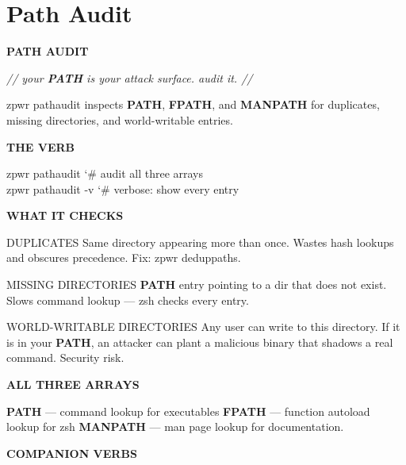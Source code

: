 \documentclass[11pt,a4paper,twoside]{book}
\begin{document}
\vspace{16pt}

\section{Path Audit}


\vspace{10pt}
{\large\bfseries\color{neoncyan} PATH AUDIT}\vspace{6pt}

{\small\itshape\color{dimtext} // your \textbf{PATH} is your attack surface. audit it. //}

zpwr pathaudit inspects \textbf{PATH}, \textbf{FPATH}, and \textbf{MANPATH} for duplicates, missing directories, and world-writable entries.


\vspace{12pt}
{\bfseries\color{neonyellow} THE VERB}\vspace{4pt}

\begin{codebox}
\color{neongreen}zpwr pathaudit             {\char`\#} audit all three arrays\\
\color{neongreen}zpwr pathaudit -v          {\char`\#} verbose: show every entry\\
\end{codebox}


\vspace{12pt}
{\bfseries\color{neonyellow} WHAT IT CHECKS}\vspace{4pt}

DUPLICATES Same directory appearing more than once. Wastes hash lookups and obscures precedence. Fix: zpwr deduppaths.

MISSING DIRECTORIES \textbf{PATH} entry pointing to a dir that does not exist. Slows command lookup — zsh checks every entry.

WORLD-WRITABLE DIRECTORIES Any user can write to this directory. If it is in your \textbf{PATH}, an attacker can plant a malicious binary that shadows a real command. Security risk.


\vspace{12pt}
{\bfseries\color{neonyellow} ALL THREE ARRAYS}\vspace{4pt}

\textbf{PATH}     — command lookup for executables \textbf{FPATH}    — function autoload lookup for zsh \textbf{MANPATH}  — man page lookup for documentation.


\vspace{12pt}
{\bfseries\color{neonyellow} COMPANION VERBS}\vspace{4pt}
\end{document}
